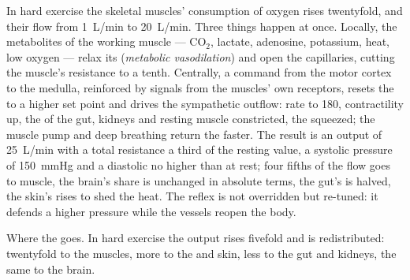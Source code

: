 \begin{proposition}[Exercise]\label{prop:b2:blood-pressure:exercise}
In hard exercise the skeletal muscles' consumption of oxygen rises
twentyfold, and their  flow from \qty{1}{L/min} to \qty{20}{L/min}.
Three things happen at once. Locally, the metabolites of the working
muscle --- $\mathrm{CO_2}$, lactate, adenosine, potassium, heat,
low oxygen --- relax its  (\emph{metabolic vasodilation})
and open the capillaries, cutting the muscle's resistance to a
tenth. Centrally, a command from the motor cortex to the medulla,
reinforced by signals from the muscles' own receptors, resets the
 to a higher set point and drives the sympathetic outflow:
rate to 180, contractility up, the  of the gut, kidneys and
resting muscle constricted, the  squeezed; the muscle pump and
deep breathing return the  faster. The result is an output of
\qty{25}{L/min} with a total resistance a third of the resting value,
a systolic pressure of \qty{150}{mmHg} and a diastolic no higher
than at rest; four fifths of the flow goes to muscle, the brain's
share is unchanged in absolute terms, the gut's is halved, the
skin's rises to shed the heat. The reflex is not overridden but
re-tuned: it defends a higher pressure while the vessels reopen the
body.
\end{proposition}

\begin{omfigure}

{\small Where the  goes. In hard exercise the output rises
fivefold and is redistributed: twentyfold to the muscles, more to
the  and skin, less to the gut and kidneys, the same to the
brain.}
\end{omfigure}

